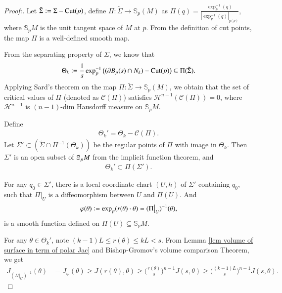 \documentclass[11pt]{amsart}
\numberwithin{equation}{section}
\def\S{{\bf\mathbb S} }
\begin{document}
\begin{proof}[Proof:] Let $\tilde{\Sigma}\vcentcolon= \Sigma-\mathrm{Cut}(p)$, define $\Pi:\tilde{\Sigma}\to \mathbb{S}_p(M)$ as $\displaystyle \Pi(q)=\frac{\exp_p^{-1}(q)}{|\exp_p^{-1}(q)|_{g(p)}}$,  where $\mathbb{S}_pM$ is the unit tangent space of $M$ at $p$. From the definition of cut points,  the map $\Pi$ is a well-defined smooth map.

From the separating property of $\Sigma$, we know that 
\begin{align}
\Theta_{k}\vcentcolon=\frac{1}{s}\exp_p^{-1}\big((\partial B_p(s)\cap N_k)-\mathrm{Cut}(p)\big)\subseteq \Pi(\tilde{\Sigma}). \nonumber 
\end{align}
Applying Sard's theorem on the map $\Pi:\tilde{\Sigma}\to \mathbb{S}_p(M)$, we obtain that the set of critical values of $\Pi$ (denoted as $\mathcal{C}(\Pi)$) satisfies $\mathcal{H}^{n- 1}(\mathcal{C}(\Pi))= 0$, where $\mathcal{H}^{n- 1}$ is $(n- 1)$-dim Hausdorff measure on $\mathbb{S}_pM$.

Define
\begin{align}
\Theta_{k}'= \Theta_{k}- \mathcal{C}(\Pi). \label{0 diff between sets}
\end{align}
Let $\Sigma'\subset (\tilde\Sigma\cap\Pi^{-1}(\Theta_{k}))$ be the regular points of $\Pi$ with image in $\Theta_{k}$. Then $\Sigma'$ is an open subset of $\S_p M$ from the implicit function theorem, and 
\begin{align}
\Theta_{k}'\subset\Pi(\Sigma'). \nonumber 
\end{align}

For any $q_0\in\Sigma'$, there is a local coordinate chart $(U,h)$ of $\Sigma'$ containing $q_0$, such that $\Pi|_{U}$ is a diffeomorphism between $U$ and $\Pi(U)$. And 
\begin{align}
\varphi(\theta)\vcentcolon=\exp_p(r(\theta)\cdot \theta)= (\Pi\big|_U)^{-1}(\theta), \nonumber 
\end{align}
is a smooth function defined on $\Pi(U)\subseteq \mathbb{S}_pM$. 

For any $\theta\in \Theta_{k}'$, note $(k- 1)L\leq r(\theta)\leq kL< s$. From Lemma \ref{lem volume of surface in term of polar Jac} and Bishop-Gromov's volume comparison Theorem, we get
\begin{align}
    J_{(\Pi\big|_U)^{-1}}(\theta)&= J_\varphi(\theta) \geq J(r(\theta),\theta) \geq \bigg(\frac{r(\theta)}{s}\bigg)^{n- 1}J(s,\theta) \geq \bigg(\frac{(k- 1)L}{s}\bigg)^{n- 1}J(s,\theta). \nonumber 
\end{align}


\end{proof}
\end{document}
